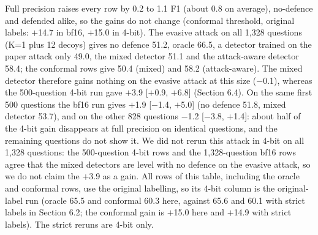 \documentclass[preprint,12pt]{elsarticle}
\begin{document}
Full precision raises every row by 0.2 to 1.1 F1 (about 0.8 on average), no-defence and defended alike, so the gains do not change (conformal threshold, original labels: $+$14.7 in bf16, $+$15.0 in 4-bit). The evasive attack on all 1,328 questions (K=1 plus 12 decoys) gives no defence 51.2, oracle 66.5, a detector trained on the paper attack only 49.0, the mixed detector 51.1 and the attack-aware detector 58.4; the conformal rows give 50.4 (mixed) and 58.2 (attack-aware). The mixed detector therefore gains nothing on the evasive attack at this size ($-$0.1), whereas the 500-question 4-bit run gave $+$3.9 [$+$0.9, $+$6.8] (Section 6.4). On the same first 500 questions the bf16 run gives $+$1.9 [$-$1.4, $+$5.0] (no defence 51.8, mixed detector 53.7), and on the other 828 questions $-$1.2 [$-$3.8, $+$1.4]: about half of the 4-bit gain disappears at full precision on identical questions, and the remaining questions do not show it. We did not rerun this attack in 4-bit on all 1,328 questions: the 500-question 4-bit rows and the 1,328-question bf16 rows agree that the mixed detectors are level with no defence on the evasive attack, so we do not claim the $+$3.9 as a gain. All rows of this table, including the oracle and conformal rows, use the original labelling, so its 4-bit column is the original-label run (oracle 65.5 and conformal 60.3 here, against 65.6 and 60.1 with strict labels in Section 6.2; the conformal gain is $+$15.0 here and $+$14.9 with strict labels). The strict reruns are 4-bit only.
\end{document}
